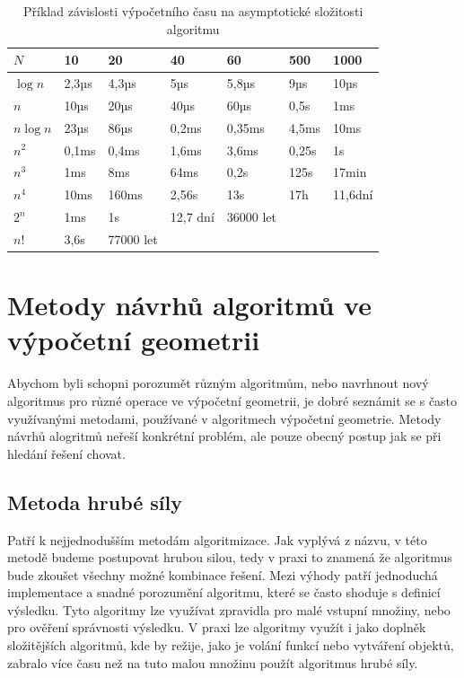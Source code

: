 	
\begin{table}

\begin{tabular}{ |p{1.4cm}||p{1.6cm}|p{1.6cm}|p{1.6cm}|p{1.6cm}|p{1.6cm}|p{1.6cm}|  }
\hline

$N$				&10			&20			&40			&60			&500		&1000\\
\hline
$\log n$		&2,3µs		&4,3µs		&5µs		&5,8µs		&9µs		&10µs\\			
$n$				&10µs		&20µs		&40µs		&60µs		&0,5s		&1ms\\
$n \log n$		&23µs		&86µs		&0,2ms		&0,35ms		&4,5ms		&10ms\\
$n^2$			&0,1ms		&0,4ms		&1,6ms		&3,6ms		&0,25s		&1s\\
$n^3$			&1ms		&8ms		&64ms		&0,2s		&125s		&17min\\
$n^4$			&10ms		&160ms		&2,56s		&13s		&17h		&11,6dní\\
$2^n$			&1ms		&1s			&12,7 dní	&36000 let	&			&\\
$n!$			&3,6s		&77000 let	&			&			&			&\\
\hline

\end{tabular}
\caption{Příklad závislosti výpočetního času na asymptotické složitosti algoritmu}
\label{tab:4-time_complexity}
\end{table}






\section{Metody návrhů algoritmů ve výpočetní geometrii}
	Abychom byli schopni porozumět různým algoritmům, nebo navrhnout nový algoritmus pro různé operace ve výpočetní geometrii, je dobré seznámit se s často využívanými metodami, používané v algoritmech výpočetní geometrie. Metody návrhů alogritmů neřeší konkrétní problém, ale pouze obecný postup jak se při hledání řešení chovat.

\subsection{Metoda hrubé síly}
	Patří k nejjednodušším metodám algoritmizace. Jak vyplývá z názvu, v této metodě budeme postupovat hrubou silou, tedy v praxi to znamená že algoritmus bude zkoušet všechny možné kombinace řešení. Mezi výhody patří jednoduchá implementace a snadné porozumění algoritmu, které se často shoduje s definicí výsledku. Tyto algoritmy lze využívat zpravidla pro malé vstupní množiny, nebo pro ověření správnosti výsledku. V praxi lze algoritmy využít i jako doplněk složitějších algoritmů, kde by režije, jako je volání funkcí nebo vytváření objektů, zabralo více času než na tuto malou množinu použít algoritmus hrubé síly.
	
